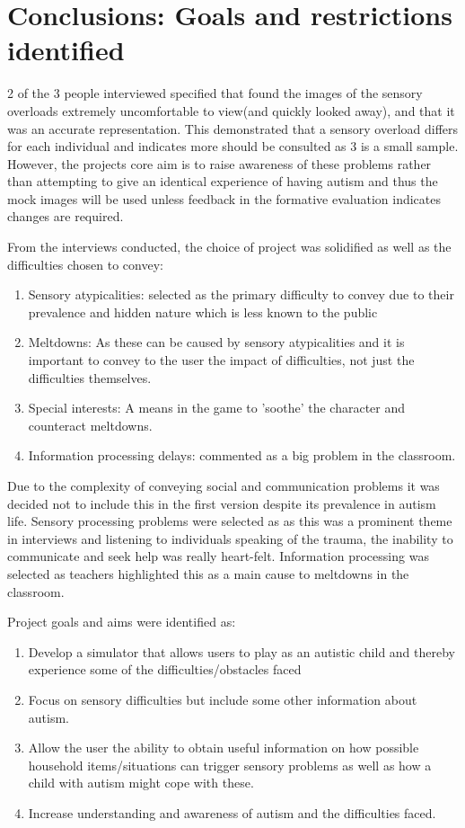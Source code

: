 \documentclass[11pt]{report}
\begin{document}
\section{Conclusions: Goals and restrictions identified}
\label{goalsandrestrictions}
2 of the 3 people interviewed specified that found the images of the sensory overloads extremely uncomfortable to view(and quickly looked away), and that it was an accurate representation. This demonstrated that a sensory overload differs for each individual and indicates more should be consulted as 3 is a small sample. However, the projects core aim is to raise awareness of these problems rather than attempting to give an identical experience of having autism and thus the mock images will be used unless feedback in the formative evaluation indicates changes are required. 

From the interviews conducted, the choice of project was solidified as well as the difficulties chosen to convey:

\begin{enumerate}
\item Sensory atypicalities: selected as the primary difficulty to convey due to their prevalence and hidden nature which is less known to the public
\item Meltdowns: As these can be caused by sensory atypicalities and it is important to convey to the user the impact of difficulties, not just the difficulties themselves.
\item Special interests: A means in the game to 'soothe' the character and counteract meltdowns.
\item Information processing delays: commented as a big problem in the classroom.
\end{enumerate}

Due to the complexity of conveying social and communication problems it was decided not to include this in the first version despite its prevalence in autism life. Sensory processing problems were selected as as this was a prominent theme in interviews and listening to individuals speaking of the trauma, the inability to communicate and seek help was really heart-felt. Information processing was selected as teachers highlighted this as a main cause to meltdowns in the classroom. 

Project goals and aims were identified as:

\begin{enumerate}
\item Develop a simulator that allows users to play as an autistic child and thereby experience some of the difficulties/obstacles faced
\item Focus on sensory difficulties but include some other information about autism.
\item Allow the user the ability to obtain useful information on how possible household items/situations can trigger sensory problems as well as how a child with autism might cope with these.
\item Increase understanding and awareness of autism and the difficulties faced.
\end{enumerate}
\end{document}
